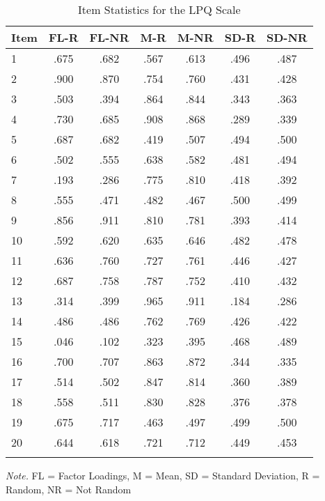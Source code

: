 \documentclass[english,man, mask]{apa6}
\theoremstyle{definition}
\theoremstyle{definition}
\theoremstyle{definition}
\theoremstyle{remark}
\begin{document}
\begin{table}[tbp]
\begin{center}
\begin{threeparttable}
\caption{\label{tab:Ltable}Item Statistics for the LPQ Scale}
\begin{tabular}{lcccccc}
\toprule
Item & \multicolumn{1}{c}{FL-R} & \multicolumn{1}{c}{FL-NR} & \multicolumn{1}{c}{M-R} & \multicolumn{1}{c}{M-NR} & \multicolumn{1}{c}{SD-R} & \multicolumn{1}{c}{SD-NR}\\
\midrule
1 & .675 & .682 & .567 & .613 & .496 & .487\\
2 & .900 & .870 & .754 & .760 & .431 & .428\\
3 & .503 & .394 & .864 & .844 & .343 & .363\\
4 & .730 & .685 & .908 & .868 & .289 & .339\\
5 & .687 & .682 & .419 & .507 & .494 & .500\\
6 & .502 & .555 & .638 & .582 & .481 & .494\\
7 & .193 & .286 & .775 & .810 & .418 & .392\\
8 & .555 & .471 & .482 & .467 & .500 & .499\\
9 & .856 & .911 & .810 & .781 & .393 & .414\\
10 & .592 & .620 & .635 & .646 & .482 & .478\\
11 & .636 & .760 & .727 & .761 & .446 & .427\\
12 & .687 & .758 & .787 & .752 & .410 & .432\\
13 & .314 & .399 & .965 & .911 & .184 & .286\\
14 & .486 & .486 & .762 & .769 & .426 & .422\\
15 & .046 & .102 & .323 & .395 & .468 & .489\\
16 & .700 & .707 & .863 & .872 & .344 & .335\\
17 & .514 & .502 & .847 & .814 & .360 & .389\\
18 & .558 & .511 & .830 & .828 & .376 & .378\\
19 & .675 & .717 & .463 & .497 & .499 & .500\\
20 & .644 & .618 & .721 & .712 & .449 & .453\\
\bottomrule
\addlinespace
\end{tabular}
\begin{tablenotes}[para]
\textit{Note.} FL = Factor Loadings, M = Mean, SD = Standard Deviation, R = Random, NR = Not Random
\end{tablenotes}
\end{threeparttable}
\end{center}
\end{table}
\end{document}
